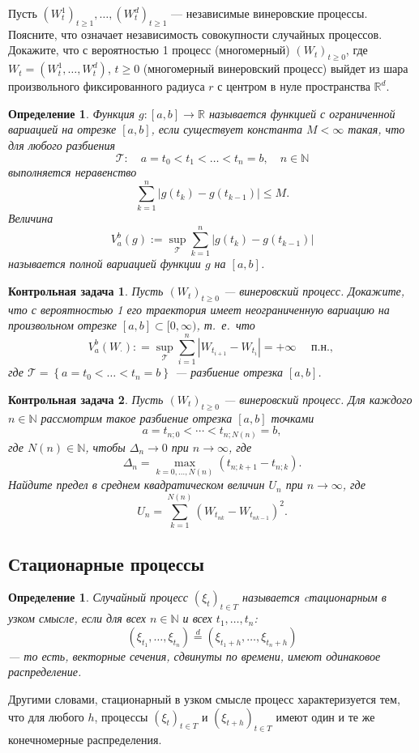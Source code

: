 \documentclass[10pt]{article}
\newtheorem{defn}[thm]{Определение}
\theoremstyle{boldnormal}
\newtheorem{zadachkontt}{Контрольная задача}[section]
\newcommand{\N}{{\ensuremath{\mathbb{N}}}}
\theoremstyle{boldremark}
\newenvironment{zadachsem}
  {\pushQED{\qed}\renewcommand{\qedsymbol}{$\triangleleft$}\zadachsemm}
  {\popQED\endzadachsemm}
\begin{document}
\begin{zadachsem} 
    Пусть $(W_t^1)_{t\geq 1}, \ldots, (W_t^d)_{t\geq 1}$
     --- независимые винеровские процессы. 
     Поясните, что означает независимость совокупности 
     случайных процессов.
     Докажите, что с вероятностью 1 процесс (многомерный) \((W_t)_{t\geq 0}\), где 
    $W_t=\left(W_t^1, \ldots, W_t^d\right)$, \(t\geq 0\)
    (многомерный винеровский процесс) выйдет из шара произвольного фиксированного
    радиуса $r$ с центром в нуле пространства $\mathbb{R}^d$.
\end{zadachsem}
\begin{defn}
Функция $g: [a,b] \to \mathbb{R}$ называется 
функцией \emph{с ограниченной вариацией} на отрезке $[a,b]$,
если существует константа $M < \infty$ такая, что для любого разбиения 
\[
\mathcal{T}: \quad a = t_0 < t_1 < \dots < t_n = b, \quad n \in \mathbb{N}
\]
выполняется неравенство
\[
\sum_{k=1}^{n} |g(t_k) - g(t_{k-1})| \le M.
\]
Величина
\[
V_a^b(g) := \sup_{\mathcal{T}} \sum_{k=1}^{n} |g(t_k) - g(t_{k-1})|
\]
называется \emph{полной вариацией} функции $g$ на $[a,b]$.
\end{defn}
\begin{zadachkontt}
    Пусть $(W_t)_{t\geq 0}$ --- 
    винеровский процесс. Докажите, что с вероятностью 
    1 его траектория имеет неограниченную вариацию
    на произвольном отрезке $[a, b] \subset [0,\infty)$, т.~е.~что
$$
V_a^b(W_{\cdot}) : = \sup_{\mathcal{T}} \sum_{i=1}^n\left|W_{t_{i+1}}-W_{t_i}\right|
= +\infty \quad \text { п.н., }
$$
где $\mathcal{T}=\left\{a=t_0<\ldots<t_n=b\right\}$
--- разбиение отрезка $[a, b]$.
\end{zadachkontt}



\begin{zadachkontt}
Пусть \((W_t)_{t\geq 0}\) --- винеровский процесс.
Для каждого \(n\in \mathbb{N}\) рассмотрим такое разбиение
отрезка \([a,b]\) точками 
\[
a=t_{n;0} < \cdots < t_{n;N(n)} = b,
\]
где \(N(n)\in \N\), чтобы \(\Delta_n \to 0\) при \(n\to\infty\), 
где \[
\Delta_n =\max\limits_{k=0,\ldots,N(n)}(t_{n;k+1}-t_{n;k}).
\]
Найдите предел в среднем квадратическом 
величин \(U_n\) при \(n\to\infty\),
где $$
U_n = \sum_{k=1}^{N(n)} (W_{t_{nk}} - W_{t_{nk-1}})^2.
$$
\end{zadachkontt}

\subsection{Стационарные процессы}
\begin{defn}
Случайный процесс $(\xi_t)_{t \in T}$
называется \emph{cтационарным в узком смысле}, если для всех \(n\in\N\) и всех $t_1, \dots, t_n$:
$$
(\xi_{t_1}, \dots, \xi_{t_n}) \overset{d}{=} (\xi_{t_1+h}, \dots, \xi_{t_n+h})
$$ 
--- то есть, векторные сечения, сдвинуты по времени,
имеют одинаковое распределение.
\end{defn}
Другими словами, стационарный в узком смысле процесс характеризуется тем,
что для любого \(h\), процессы \((\xi_t)_{t\in T}\) и \((\xi_{t+h})_{t\in T}\) имеют
один и те же конечномерные распределения.
\end{document}

